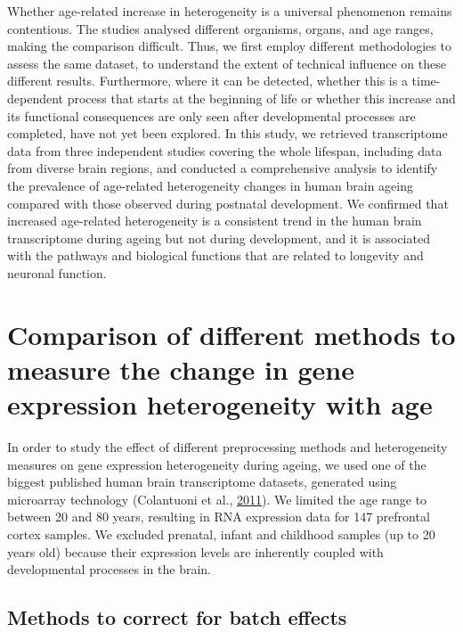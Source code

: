 \documentclass[12pt,twoside]{unicam}
\begin{document}
Whether age-related increase in heterogeneity is a universal phenomenon remains contentious. The studies analysed different organisms, organs, and age ranges, making the comparison difficult. Thus, we first employ different methodologies to assess the same dataset, to understand the extent of technical influence on these different results. Furthermore, where it can be detected, whether this is a time-dependent process that starts at the beginning of life or whether this increase and its functional consequences are only seen after developmental processes are completed, have not yet been explored. In this study, we retrieved transcriptome data from three independent studies covering the whole lifespan, including data from diverse brain regions, and conducted a comprehensive analysis to identify the prevalence of age-related heterogeneity changes in human brain ageing compared with those observed during postnatal development. We confirmed that increased age-related heterogeneity is a consistent trend in the human brain transcriptome during ageing but not during development, and it is associated with the pathways and biological functions that are related to longevity and neuronal function.

\hypertarget{veronikaresults}{%
\section{Comparison of different methods to measure the change in gene expression heterogeneity with age}\label{veronikaresults}}

In order to study the effect of different preprocessing methods and heterogeneity measures on gene expression heterogeneity during ageing, we used one of the biggest published human brain transcriptome datasets, generated using microarray technology (Colantuoni et al., \protect\hyperlink{ref-Colantuoni2011}{2011}). We limited the age range to between 20 and 80 years, resulting in RNA expression data for 147 prefrontal cortex samples. We excluded prenatal, infant and childhood samples (up to 20 years old) because their expression levels are inherently coupled with developmental processes in the brain.

\hypertarget{methods-to-correct-for-batch-effects}{%
\subsection{Methods to correct for batch effects}\label{methods-to-correct-for-batch-effects}}
\end{document}
